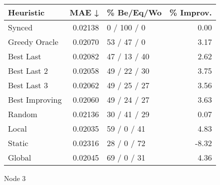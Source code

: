 \begin{tabular}{lrlr}
\toprule
\textbf{Heuristic} & \textbf{MAE ↓} & \textbf{\% Be/Eq/Wo} & \textbf{\% Improv.} \\
\midrule
            Synced &        0.02138 &          0 / 100 / 0 &                0.00 \\
     Greedy Oracle &        0.02070 &          53 / 47 / 0 &                3.17 \\
         Best Last &        0.02082 &         47 / 13 / 40 &                2.62 \\
       Best Last 2 &        0.02058 &         49 / 22 / 30 &                3.75 \\
       Best Last 3 &        0.02062 &         49 / 25 / 27 &                3.56 \\
    Best Improving &        0.02060 &         49 / 24 / 27 &                3.63 \\
            Random &        0.02136 &         30 / 41 / 29 &                0.07 \\
             Local &        0.02035 &          59 / 0 / 41 &                4.83 \\
            Static &        0.02316 &          28 / 0 / 72 &               -8.32 \\
            Global &        0.02045 &          69 / 0 / 31 &                4.36 \\
\bottomrule
\end{tabular}
\caption{Node 3}
\label{tab:non_lr01_le1_bs4_3}
